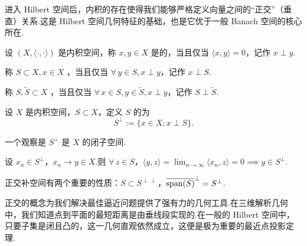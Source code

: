 进入 Hilbert 空间后，内积的存在使得我们能够严格定义向量之间的“正交”（垂直）关系.这是 Hilbert 空间几何特征的基础，也是它优于一般 Banach 空间的核心所在.

\begin{definition}[正交]
    设 $(X, \langle \cdot, \cdot \rangle)$ 是内积空间，称 $x, y \in X$ 是的，当且仅当 $\langle x, y \rangle = 0$，记作 $x \perp y$.\par
    称 $S \subset X, x \in X$ ，当且仅当 $\forall\, y \in S, x \perp y$，记作 $x \perp S$.\par
    称 $S, \tilde{S} \subset X$ ，当且仅当 $\forall\, x \in S, y \in \tilde{S}, x \perp y$，记作 $S \perp \tilde{S}$.
\end{definition}

\begin{definition}[正交补空间]
    设 $X$ 是内积空间，$S \subset X$，定义 $S$ 的为
    \[
        S^\perp := \{x \in X : x \perp S\}.
    \]
\end{definition}

一个观察是 $S^\perp$ 是 $X$ 的闭子空间.\par
设 $x_n \in S^\perp$，$x_n \to y \in X$.则 $\forall\, z \in S$，$\langle y, z \rangle = \lim_{n \to \infty} \langle x_n, z \rangle = 0 \implies y \in S^\perp$.

\begin{note}
    正交补空间有两个重要的性质：$S \subset S^{\perp\perp}$，$\overline{\operatorname{span}(S)}^\perp = S^\perp$.
\end{note}

正交的概念为我们解决最佳逼近问题提供了强有力的几何工具.在三维解析几何中，我们知道点到平面的最短距离是由垂线段实现的.在一般的 Hilbert 空间中，只要子集是闭且凸的，这一几何直观依然成立，这便是极为重要的最近点投影定理.

